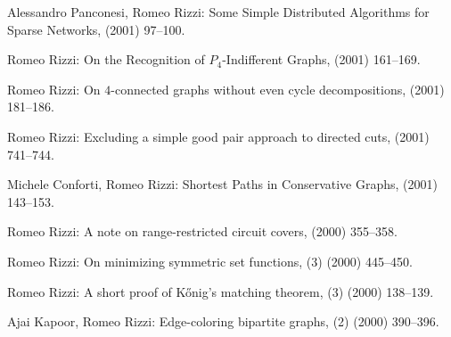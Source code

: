 \begin{etaremune}
  \item {\sc Alessandro Panconesi, Romeo Rizzi:}
   \newblock  Some Simple Distributed Algorithms for Sparse Networks,
    (2001) 97--100.

  \item {\sc Romeo Rizzi:}
   \newblock  On the Recognition of $P_4$-Indifferent Graphs,
    (2001) 161--169.

  \item {\sc Romeo Rizzi:}
   \newblock  On $4$-connected graphs without even cycle decompositions,
    (2001) 181--186.

  \item {\sc Romeo Rizzi:}
   \newblock  Excluding a simple good pair approach to directed cuts,
    (2001) 741--744.

  \item {\sc Michele Conforti, Romeo Rizzi:}  
   \newblock  Shortest Paths in Conservative Graphs,
    (2001) 143--153.

  \item {\sc Romeo Rizzi:}
   \newblock  A note on range-restricted circuit covers,
    (2000) 355--358.

  \item {\sc Romeo Rizzi:}
   \newblock  On minimizing symmetric set functions,
   (3) (2000) 445--450.

  \item {\sc Romeo Rizzi:}
   \newblock  A short proof of K\H{o}nig's matching theorem,
   (3) (2000) 138--139.

  \item {\sc Ajai Kapoor, Romeo Rizzi:}
   \newblock  Edge-coloring bipartite graphs,
   (2) (2000) 390--396.


\end{etaremune}
